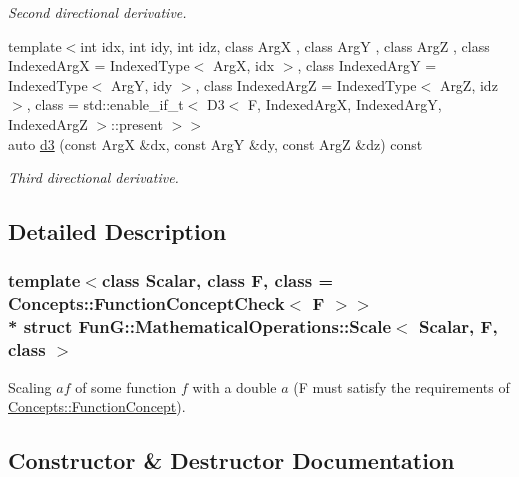 \begin{DoxyCompactItemize}
\begin{DoxyCompactList}\small\item\em Second directional derivative. \end{DoxyCompactList}\item 
{\footnotesize template$<$int idx, int idy, int idz, class ArgX , class ArgY , class ArgZ , class Indexed\+ArgX  = Indexed\+Type$<$ Arg\+X, idx $>$, class Indexed\+ArgY  = Indexed\+Type$<$ Arg\+Y, idy $>$, class Indexed\+ArgZ  = Indexed\+Type$<$ Arg\+Z, idz $>$, class  = std\+::enable\+\_\+if\+\_\+t$<$                           D3$<$ F, Indexed\+Arg\+X, Indexed\+Arg\+Y, Indexed\+Arg\+Z $>$\+::present $>$$>$ }\\auto \hyperlink{structFunG_1_1MathematicalOperations_1_1Scale_a6ce8474b165f7d6787ced74f89353f8e}{d3} (const ArgX \&dx, const ArgY \&dy, const ArgZ \&dz) const 
\begin{DoxyCompactList}\small\item\em Third directional derivative. \end{DoxyCompactList}\end{DoxyCompactItemize}


\subsection{Detailed Description}
\subsubsection*{template$<$class Scalar, class F, class = Concepts\+::\+Function\+Concept\+Check$<$ F $>$$>$\\*
struct Fun\+G\+::\+Mathematical\+Operations\+::\+Scale$<$ Scalar, F, class $>$}

Scaling $ af $ of some function $ f $ with a double $ a $ (F must satisfy the requirements of \hyperlink{structFunG_1_1Concepts_1_1FunctionConcept}{Concepts\+::\+Function\+Concept}). 

\subsection{Constructor \& Destructor Documentation}
